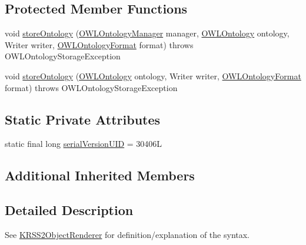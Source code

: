 \subsection*{Protected Member Functions}
\begin{DoxyCompactItemize}
\item 
void \hyperlink{classde_1_1uulm_1_1ecs_1_1ai_1_1owlapi_1_1krssrenderer_1_1_k_r_s_s2_syntax_ontology_storer_a32053d6366fcebc5166c771569b8269e}{store\-Ontology} (\hyperlink{interfaceorg_1_1semanticweb_1_1owlapi_1_1model_1_1_o_w_l_ontology_manager}{O\-W\-L\-Ontology\-Manager} manager, \hyperlink{interfaceorg_1_1semanticweb_1_1owlapi_1_1model_1_1_o_w_l_ontology}{O\-W\-L\-Ontology} ontology, Writer writer, \hyperlink{classorg_1_1semanticweb_1_1owlapi_1_1model_1_1_o_w_l_ontology_format}{O\-W\-L\-Ontology\-Format} format)  throws O\-W\-L\-Ontology\-Storage\-Exception 
\item 
void \hyperlink{classde_1_1uulm_1_1ecs_1_1ai_1_1owlapi_1_1krssrenderer_1_1_k_r_s_s2_syntax_ontology_storer_aba672f6ad90a139fbf5211d0768c7234}{store\-Ontology} (\hyperlink{interfaceorg_1_1semanticweb_1_1owlapi_1_1model_1_1_o_w_l_ontology}{O\-W\-L\-Ontology} ontology, Writer writer, \hyperlink{classorg_1_1semanticweb_1_1owlapi_1_1model_1_1_o_w_l_ontology_format}{O\-W\-L\-Ontology\-Format} format)  throws O\-W\-L\-Ontology\-Storage\-Exception 
\end{DoxyCompactItemize}
\subsection*{Static Private Attributes}
\begin{DoxyCompactItemize}
\item 
static final long \hyperlink{classde_1_1uulm_1_1ecs_1_1ai_1_1owlapi_1_1krssrenderer_1_1_k_r_s_s2_syntax_ontology_storer_add1c2c568ba3b027759d96097e70613a}{serial\-Version\-U\-I\-D} = 30406\-L
\end{DoxyCompactItemize}
\subsection*{Additional Inherited Members}


\subsection{Detailed Description}
See \hyperlink{classde_1_1uulm_1_1ecs_1_1ai_1_1owlapi_1_1krssrenderer_1_1_k_r_s_s2_object_renderer}{K\-R\-S\-S2\-Object\-Renderer} for definition/explanation of the syntax.

